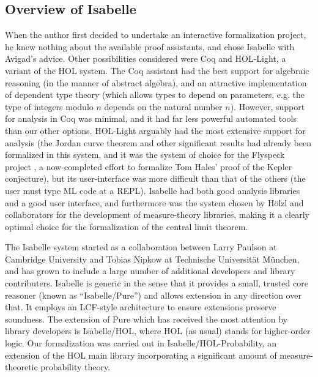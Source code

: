 \documentclass{article}
\theoremstyle{definition}
\begin{document}
\subsection{Overview of Isabelle}

When the author first decided to undertake an interactive formalization project, he knew nothing about the available proof assistants, and chose Isabelle with Avigad's advice. Other possibilities considered were Coq and HOL-Light, a variant of the HOL system. The Coq assistant \cite{coq-ref} had the best support for algebraic reasoning (in the manner of abstract algebra), and an attractive implementation of dependent type theory (which allows types to depend on parameters, e.g. the type of integers modulo $n$ depends on the natural number $n$). However, support for analysis in Coq was minimal, and it had far less powerful automated tools than our other options. HOL-Light \cite{harrison-hol-light} arguably had the most extensive support for analysis (the Jordan curve theorem \cite{hales-jordan} and other significant results had already been formalized in this system, and it was the system of choice for the Flyspeck project \cite{hales-kepler}, a now-completed effort to formalize Tom Hales' proof of the Kepler conjecture), but its user-interface was more difficult than that of the others (the user must type ML code at a REPL). Isabelle had both good analysis libraries and a good user interface, and furthermore was the system chosen by H\"olzl and collaborators for the development of measure-theory libraries, making it a clearly optimal choice for the formalization of the central limit theorem.

The Isabelle system started as a collaboration between Larry Paulson at Cambridge University and Tobias Nipkow at Technische Universit\"at M\"unchen, and has grown to include a large number of additional developers and library contributers. Isabelle is generic in the sense that it provides a small, trusted core reasoner (known as ``Isabelle/Pure'') and allows extension in any direction over that. It employs an LCF-style architecture \cite{gordon-lcf} to ensure extensions preserve soundness. The extension of Pure which has received the most attention by library developers is Isabelle/HOL, where HOL (as usual) stands for higher-order logic. Our formalization was carried out in Isabelle/HOL-Probability, an extension of the HOL main library incorporating a significant amount of measure-theoretic probability theory.
\end{document}
